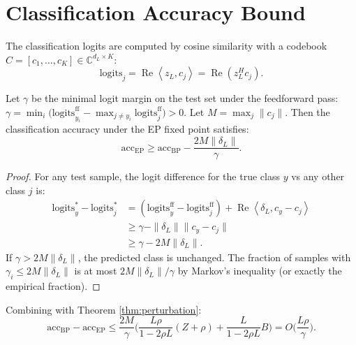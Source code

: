 \documentclass[11pt]{article}
\newcommand{\C}{\mathbb{C}}
\DeclareMathOperator{\Real}{Re}
\newcommand{\ip}[2]{\left\langle #1, #2 \right\rangle}
\begin{document}
\section{Classification Accuracy Bound}

The classification logits are computed by cosine similarity with a
codebook $C = [c_1,\dots,c_K] \in \C^{d_L \times K}$:
\begin{equation}
  \text{logits}_j = \Real \ip{z_L}{c_j} = \Real(z_L^H c_j).
\end{equation}

\begin{theorem}
\label{thm:accuracy}
Let $\gamma$ be the minimal logit margin on the test set under the
feedforward pass:
$\gamma = \min_{i} \big(\text{logits}_{y_i}^{\text{ff}} - \max_{j\ne y_i}
\text{logits}_j^{\text{ff}}\big) > 0$.
Let $M = \max_j \|c_j\|$. Then the classification accuracy under the
EP fixed point satisfies:
\begin{equation}
  \text{acc}_\text{EP} \ge \text{acc}_\text{BP}
  - \frac{2M \|\delta_L\|}{\gamma}.
\end{equation}
\end{theorem}

\begin{proof}
For any test sample, the logit difference for the true class $y$ vs
any other class $j$ is:
\begin{align}
  \text{logits}_y^* - \text{logits}_j^*
  &= (\text{logits}_y^{\text{ff}} - \text{logits}_j^{\text{ff}})
  + \Real\ip{\delta_L}{c_y - c_j} \\
  &\ge \gamma - \|\delta_L\| \|c_y - c_j\| \\
  &\ge \gamma - 2M \|\delta_L\|.
\end{align}
If $\gamma > 2M \|\delta_L\|$, the predicted class is unchanged.
The fraction of samples with $\gamma_i \le 2M \|\delta_L\|$ is at most
$2M \|\delta_L\| / \gamma$ by Markov's inequality (or exactly the
empirical fraction).
\end{proof}

Combining with Theorem \ref{thm:perturbation}:
\begin{equation}
  \text{acc}_\text{BP} - \text{acc}_\text{EP}
  \le \frac{2M}{\gamma} \Big(
  \frac{L\rho}{1-2\rho L} (Z + \rho) + \frac{L}{1-2\rho L} B \Big)
  = O\Big(\frac{L\rho}{\gamma}\Big).
\end{equation}
\end{document}

